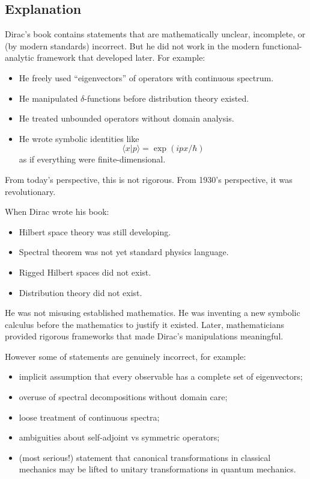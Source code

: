\subsection{Explanation}
\label{cq:explanation}

Dirac's book \cite{dirac-pqm} contains
statements that are mathematically unclear, incomplete, or (by modern standards) incorrect. 
But he did not work in the modern functional-analytic framework that developed later.
For example:
\begin{itemize}
   \item He freely used “eigenvectors” of operators with continuous spectrum.
    \item He manipulated $ \delta $-functions before distribution theory existed.
    \item He treated unbounded operators without domain analysis.
    \item He wrote symbolic identities like \[ \langle x|p \rangle=\exp(i p x/\hbar) \]
as if everything were finite-dimensional.
\end{itemize}
From today’s perspective, this is not rigorous.
From 1930’s perspective, it was revolutionary.

When Dirac wrote his book:
\begin{itemize}
   \item Hilbert space theory was still developing.
\item Spectral theorem was not yet standard physics language.
\item Rigged Hilbert spaces did not exist.
\item Distribution theory did not exist.
\end{itemize}
He was not misusing established mathematics.
He was inventing a new symbolic calculus before the mathematics to justify it existed.
Later, mathematicians 
provided rigorous frameworks that made Dirac’s manipulations meaningful.

However some of statements are genuinely incorrect, for example:
\begin{itemize}
   \item implicit assumption that every observable has a complete set of eigenvectors;
\item overuse of spectral decompositions without domain care;
\item loose treatment of continuous spectra;
\item ambiguities about self-adjoint vs symmetric operators;
\item (most serious!) statement that canonical transformations in classical mechanics 
    may be lifted to unitary transformations in quantum mechanics.
\end{itemize}

